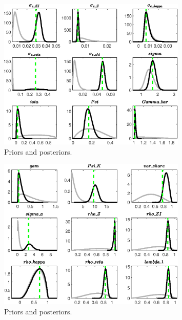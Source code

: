  
\begin{figure}[H]
\centering
\includegraphics[width=0.80\textwidth]{directed_search_est/Output/directed_search_est_PriorsAndPosteriors1}
\caption{Priors and posteriors.}\label{Fig:PriorsAndPosteriors:1}
\end{figure}
 
\begin{figure}[H]
\centering
\includegraphics[width=0.80\textwidth]{directed_search_est/Output/directed_search_est_PriorsAndPosteriors2}
\caption{Priors and posteriors.}\label{Fig:PriorsAndPosteriors:2}
\end{figure}
 
